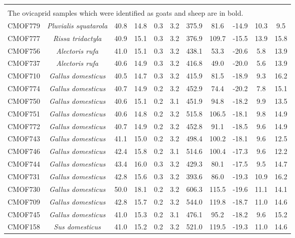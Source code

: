 \documentclass[preprint, 3p, authoryear]{elsarticle} %
\begin{document}
\begin{longtable}[t]{c>{}cccccccccc}
\endfoot
\bottomrule
\multicolumn{11}{l}{\rule{0pt}{1em}\textit{Note: }}\\
\multicolumn{11}{l}{\rule{0pt}{1em}The ovicaprid samples which were identified as goats and sheep are in bold.}\\
\endlastfoot
CMOF779 & \em{Pluvialis squatarola} & 40.8 & 14.8 & 0.3 & 3.2 & 375.9 & 81.6 & -14.9 & 10.3 & 9.5\\
CMOF777 & \em{Rissa tridactyla} & 40.9 & 15.1 & 0.3 & 3.2 & 376.9 & 109.7 & -15.5 & 13.9 & 15.8\\
CMOF756 & \em{Alectoris rufa} & 41.0 & 15.1 & 0.3 & 3.2 & 438.1 & 53.3 & -20.6 & 5.8 & 13.9\\
CMOF737 & \em{Alectoris rufa} & 40.6 & 14.9 & 0.3 & 3.2 & 416.8 & 49.0 & -20.0 & 5.6 & 13.9\\
CMOF710 & \em{Gallus domesticus} & 40.5 & 14.7 & 0.3 & 3.2 & 415.9 & 81.5 & -18.9 & 9.3 & 16.2\\
CMOF774 & \em{Gallus domesticus} & 40.7 & 14.9 & 0.2 & 3.2 & 452.9 & 74.4 & -20.2 & 7.8 & 15.1\\
CMOF750 & \em{Gallus domesticus} & 40.6 & 15.1 & 0.2 & 3.1 & 451.9 & 94.8 & -18.2 & 9.9 & 13.5\\
CMOF751 & \em{Gallus domesticus} & 40.6 & 14.8 & 0.2 & 3.2 & 515.8 & 106.5 & -18.1 & 9.8 & 14.9\\
CMOF772 & \em{Gallus domesticus} & 40.7 & 14.9 & 0.2 & 3.2 & 452.8 & 91.1 & -18.5 & 9.6 & 14.9\\
CMOF743 & \em{Gallus domesticus} & 41.1 & 15.0 & 0.2 & 3.2 & 498.4 & 100.2 & -18.1 & 9.6 & 12.5\\
CMOF746 & \em{Gallus domesticus} & 42.4 & 15.8 & 0.2 & 3.1 & 514.6 & 100.4 & -17.3 & 9.6 & 12.2\\
CMOF744 & \em{Gallus domesticus} & 43.4 & 16.0 & 0.3 & 3.2 & 429.3 & 80.1 & -17.5 & 9.5 & 14.7\\
CMOF731 & \em{Gallus domesticus} & 42.8 & 15.6 & 0.3 & 3.2 & 393.6 & 86.0 & -19.3 & 10.9 & 16.2\\
CMOF730 & \em{Gallus domesticus} & 50.0 & 18.1 & 0.2 & 3.2 & 606.3 & 115.5 & -19.6 & 11.1 & 14.1\\
CMOF709 & \em{Gallus domesticus} & 42.8 & 15.7 & 0.2 & 3.2 & 544.0 & 119.8 & -18.7 & 11.0 & 14.6\\
CMOF745 & \em{Gallus domesticus} & 41.0 & 15.3 & 0.2 & 3.1 & 476.1 & 95.2 & -18.2 & 9.6 & 15.2\\
CMOF158 & \em{Sus domesticus} & 41.0 & 15.2 & 0.2 & 3.2 & 521.0 & 119.5 & -19.3 & 11.0 & 14.6\\

\end{longtable}
\end{document}
